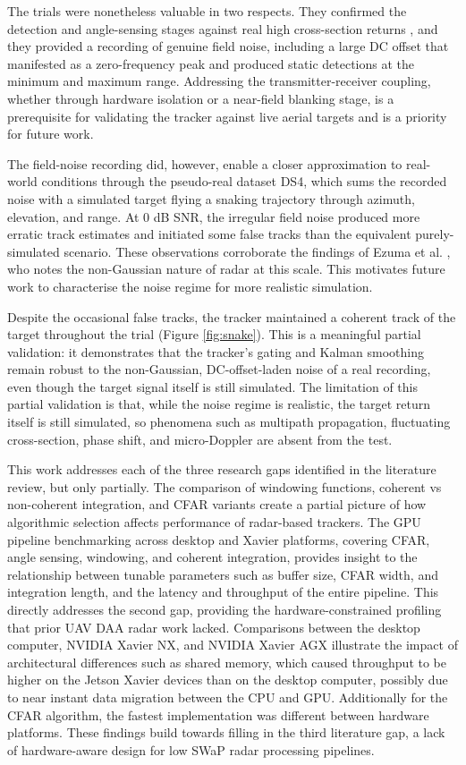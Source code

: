 The trials were nonetheless valuable in two respects. They 
confirmed the detection and angle-sensing stages against real high cross-section returns
, and they provided a recording of genuine field noise, including a large DC offset 
that manifested as a zero-frequency peak and produced static detections at the minimum 
and maximum range. Addressing the transmitter-receiver coupling, whether through 
hardware isolation or a near-field blanking stage, is a prerequisite for validating the 
tracker against live aerial targets and is a priority for future work.

The field-noise recording did, however, enable a closer approximation to real-world 
conditions through the pseudo-real dataset DS4, which sums the recorded noise with a 
simulated target flying a snaking trajectory through azimuth, elevation, and range. At 0
dB SNR, the irregular field noise produced more erratic track estimates and initiated 
some false tracks than the equivalent purely-simulated scenario. These observations 
corroborate the findings of Ezuma et al. \cite{ezuma2019microuav},
who notes the non-Gaussian nature of radar at this scale. This motivates future work
to characterise the noise regime for more realistic simulation. 

Despite the occasional false tracks, the tracker maintained a coherent track 
of the target 
throughout the trial (Figure \ref{fig:snake}). This 
is a meaningful partial validation: it demonstrates that the tracker's gating and 
Kalman smoothing remain robust to the non-Gaussian, DC-offset-laden noise of a real 
recording, even though the target signal itself is still simulated. 
The limitation of this partial validation is that, while the noise regime is realistic, the target return itself is still simulated, so phenomena such as multipath propagation, fluctuating cross-section, phase shift, and micro-Doppler are absent from the test.

This work addresses each of the three research gaps identified in the
literature review, but only partially. The comparison of windowing 
functions, coherent vs non-coherent integration, and CFAR variants
create a partial picture of how algorithmic selection affects 
performance of radar-based trackers. The GPU pipeline benchmarking 
across desktop and Xavier platforms, covering CFAR, angle
sensing, windowing, and coherent integration, provides insight to the 
relationship between tunable parameters such as buffer size, CFAR width,
and integration length, and the latency and throughput of the entire 
pipeline. This directly addresses the second gap, providing the 
hardware-constrained profiling
that prior UAV DAA radar work lacked. Comparisons between the desktop 
computer, NVIDIA Xavier NX, and NVIDIA Xavier AGX illustrate the impact of
architectural differences such as shared memory, which caused throughput to be
higher on the Jetson Xavier devices than on the desktop computer, possibly due
to near instant data migration between the CPU and GPU. Additionally for the 
CFAR algorithm, the fastest implementation was different between 
hardware platforms. These findings build towards filling in the third  
literature gap, a lack of hardware-aware
design for low SWaP radar processing pipelines. 

